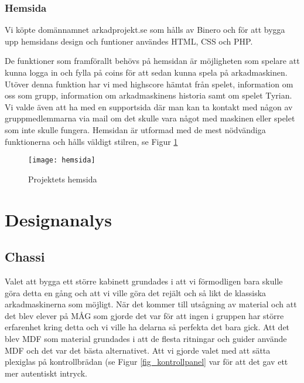 \documentclass[12pt,fleqn,openany]{book} %
\begin{document}
\subsection{Hemsida}

Vi köpte domännamnet arkadprojekt.se som hålls av Binero och för att bygga upp hemsidans design och funtioner användes HTML, CSS och PHP.

De funktioner som framförallt behövs på hemsidan är möjligheten som spelare att kunna logga in och fylla på coins för att sedan kunna spela 
på arkadmaskinen. Utöver denna funktion har vi med highscore hämtat från spelet, information om oss som grupp, information om arkadmaskinens 
historia samt om spelet Tyrian. Vi valde även att ha med en supportsida där man kan ta kontakt med någon av gruppmedlemmarna via mail om det 
skulle vara något med maskinen eller spelet som inte skulle fungera. Hemsidan är utformad med de mest nödvändiga funktionerna och hålls väldigt stilren, se Figur \ref{fig_hemsida}
\begin{figure}[h]
\centering\texttt{[image: hemsida]}
\caption{Projektets hemsida}
\label{fig_hemsida}
\end{figure}


\chapter{Designanalys}

\section{Chassi}
Valet att bygga ett större kabinett grundades i att vi förmodligen bara skulle göra detta en gång och att vi ville göra det 
rejält och så likt de klassiska arkadmaskinerna som möjligt. När det kommer till utsågning av material och att det blev elever 
på MÅG som gjorde det var för att ingen i gruppen har större erfarenhet kring detta och vi ville ha delarna så perfekta det 
bara gick. Att det blev MDF som material grundades i att de flesta ritningar och guider använde MDF och det var det bästa 
alternativet. Att vi gjorde valet med att sätta plexiglas på kontrollbrädan (se Figur \ref{fig_kontrollpanel} var för att det gav ett mer autentiskt intryck.
\end{document}
